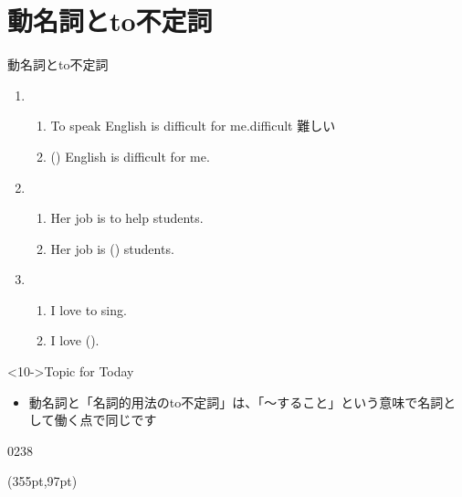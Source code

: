 \documentclass[aspectratio=169,xcolor={dvipsnames,table}]{beamer}
\begin{document}
\section{動名詞とto不定詞}
\begin{frame}[plain,t]{動名詞とto不定詞}

\begin{enumerate}
 \item<1-> \begin{enumerate}
	\item To speak English is difficult for me.\hfill{\scriptsize difficult  難しい}
	\item () English is difficult for me.%
\hspace{51pt}
       \end{enumerate}
 \item<4->  \begin{enumerate}
	\item Her job is to help students.
	\item Her job is () students.%
\hfill{}
       \end{enumerate}
 \item<7-> \begin{enumerate}
	\item I love to sing.
	\item I love ().%
\hspace{146pt}

       \end{enumerate}
\end{enumerate}

\vspace{53pt}

\begin{block}<10->{Topic for Today}
\begin{itemize}[square]\small
 \item  動名詞と「名詞的用法のto不定詞」は、「〜すること」という意味で名詞として働く点で同じです
\end{itemize}
     \end{block}

\vspace{-15pt}

\hfill{\tiny 0238}\,{\scriptsize {}}

\begin{textblock*}{0.4\linewidth}(355pt,97pt)
\end{textblock*}


\end{frame}
\end{document}

